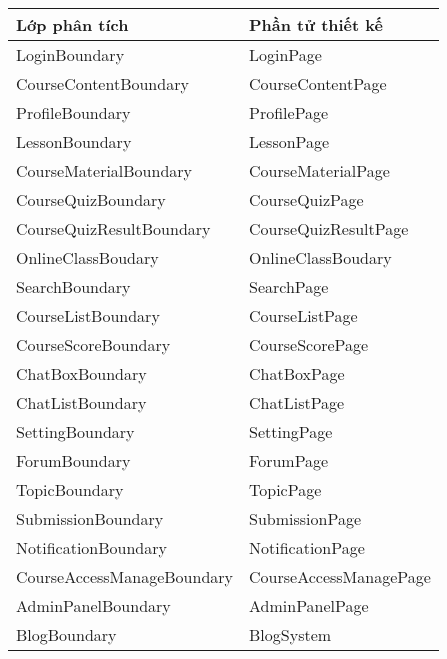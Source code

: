 \documentclass[./../main_file.tex]{subfiles}
\begin{document}
	\begin{longtable}{|p{.5\linewidth}|p{.5\linewidth}|}
		\hline
		\textbf{Lớp phân tích} & \textbf{Phần tử thiết kế} \\ \hline
		LoginBoundary              & LoginPage                \\ \hline
		CourseContentBoundary      & CourseContentPage        \\ \hline
		ProfileBoundary            & ProfilePage              \\ \hline
		LessonBoundary             & LessonPage               \\ \hline
		CourseMaterialBoundary     & CourseMaterialPage       \\ \hline
		CourseQuizBoundary         & CourseQuizPage           \\ \hline
		CourseQuizResultBoundary   & CourseQuizResultPage     \\ \hline
		OnlineClassBoudary         & OnlineClassBoudary       \\ \hline
		SearchBoundary             & SearchPage               \\ \hline
		CourseListBoundary         & CourseListPage           \\ \hline
		CourseScoreBoundary        & CourseScorePage          \\ \hline
		ChatBoxBoundary            & ChatBoxPage              \\ \hline
		ChatListBoundary           & ChatListPage             \\ \hline
		SettingBoundary            & SettingPage              \\ \hline
		ForumBoundary              & ForumPage                \\ \hline
		TopicBoundary              & TopicPage                \\ \hline
		SubmissionBoundary         & SubmissionPage           \\ \hline
		NotificationBoundary       & NotificationPage         \\ \hline
		CourseAccessManageBoundary & CourseAccessManagePage   \\ \hline
		AdminPanelBoundary         & AdminPanelPage           \\ \hline
		BlogBoundary               & BlogSystem               \\ \hline

\end{longtable}
\end{document}
